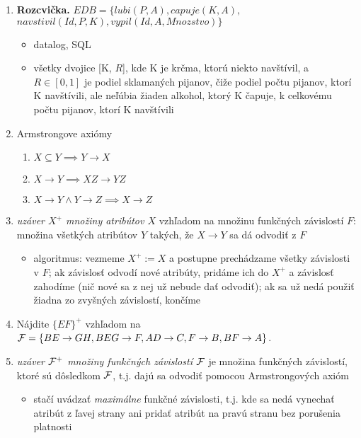 \documentclass[10pt, a4paper]{article}
\begin{document}
\begin{enumerate}
\item {\bf Rozcvička.} $EDB=\{lubi(P, A), capuje(K, A),$\\
\hspace*{1cm} $navstivil(Id, P, K), vypil(Id, A, Mnozstvo)\}$
\begin{itemize}
    \item datalog, SQL
    \item všetky dvojice [K, $R$], kde K je krčma, ktorú niekto navštívil,
        a $R\in [0,1]$ je podiel sklamaných pijanov, čiže podiel počtu pijanov, ktorí K navštívili, ale neľúbia žiaden alkohol, ktorý K čapuje,
        k celkovému počtu pijanov, ktorí K navštívili
\end{itemize}

\item Armstrongove axiómy
\begin{enumerate}
    \item $X\subseteq Y \implies Y\to X$
    \item $X\to Y \implies XZ\to YZ$
    \item $X\to Y \wedge Y\to Z\implies X\to Z$
\end{enumerate}

\item \emph{uzáver $X^+$ množiny atribútov $X$} vzhľadom na množinu funkčných závislostí $F$: množina všetkých atribútov $Y$ takých, že $X\to Y$ sa dá odvodiť z $F$
\begin{itemize}
    \item algoritmus: vezmeme $X^+ := X$ a postupne prechádzame všetky závislosti v $F$;
        ak závislosť odvodí nové atribúty, pridáme ich do $X^+$ a závislosť zahodíme (nič nové sa z nej už nebude dať odvodiť);
        ak sa už nedá použiť žiadna zo zvyšných závislostí, končíme
\end{itemize}

\item Nájdite $\{EF\}^+$ vzhľadom na ${\cal F}=\{BE\to GH, BEG\to F, AD\to C, F\to B, BF\to A\}$.

\item \emph{uzáver ${\cal F}^+$ množiny funkčných závislostí ${\cal F}$} je množina funkčných závislostí, ktoré sú dôsledkom ${\cal F}$, t.j. dajú sa odvodiť pomocou Armstrongových axióm
\begin{itemize}
    \item stačí uvádzať \emph{maximálne} funkčné závislosti, t.j. kde sa nedá vynechať atribút z ľavej strany ani pridať atribút na pravú stranu bez porušenia platnosti
\end{itemize}


\end{enumerate}
\end{document}
